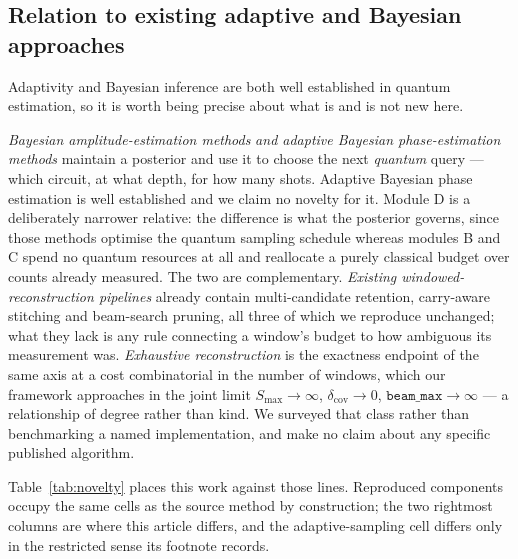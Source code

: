 \documentclass[final,5p,times,longtitle]{elsarticle}
\newcommand{\dcov}{\delta_{\mathrm{cov}}}
\newcommand{\Smax}{S_{\max}}
\newcommand{\beammax}{\texttt{beam\_max}}
\begin{document}
\subsection{Relation to existing adaptive and Bayesian approaches}
\label{sec:related}

Adaptivity and Bayesian inference are both well established in quantum
estimation, so it is worth being precise about what is and is not new
here.

\emph{Bayesian amplitude-estimation methods}
\cite{bae2025,biqae2026,vqae2022} \emph{and adaptive Bayesian
phase-estimation methods} \cite{wiebe2016,paesani2017} maintain a posterior
and use it to choose the next \emph{quantum} query --- which circuit, at
what depth, for how many shots. Adaptive Bayesian phase estimation is well
established and we claim no novelty for it. Module D is a deliberately narrower relative: the difference is
what the posterior governs, since those methods optimise the quantum
sampling schedule whereas modules B and C spend no quantum resources at all
and reallocate a purely classical budget over counts already measured. The
two are complementary. \emph{Existing windowed-reconstruction pipelines}
\cite{wqpe2025,modularshor2025} already contain multi-candidate retention,
carry-aware stitching and beam-search pruning, all three of which we
reproduce unchanged; what they lack is any rule connecting a window's
budget to how ambiguous its measurement was. \emph{Exhaustive
reconstruction} is the exactness endpoint of the same axis at a cost
combinatorial in the number of windows, which our framework approaches in
the joint limit $\Smax\to\infty$, $\dcov\to0$, $\beammax\to\infty$ --- a
relationship of degree rather than kind. We surveyed that class rather than
benchmarking a named implementation, and make no claim about any specific
published algorithm.

Table~\ref{tab:novelty} places this work against those lines. Reproduced
components occupy the same cells as the source method by construction; the
two rightmost columns are where this article differs, and the
adaptive-sampling cell differs only in the restricted sense its footnote
records.
\end{document}
